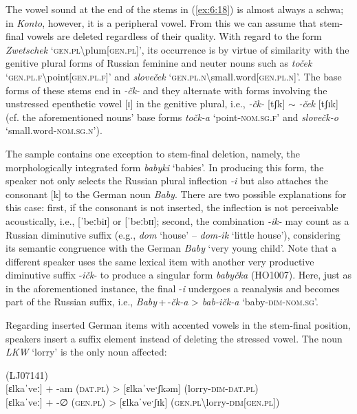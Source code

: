 \noindent The vowel sound at the end of the stems in (\ref{ex:6:18}) is almost always a schwa; in \textit{Konto}, however, it is a peripheral vowel. From this we can assume that stem-final vowels are deleted regardless of their quality. With regard to the form \textit{Zwetschek} `\textsc{gen.pl}\textbackslash{}plum[\textsc{gen.pl}]', its occurrence is by virtue of similarity with the genitive plural forms of Russian feminine and neuter nouns such as \textit{toček}  `\textsc{gen.pl.f}\textbackslash point[\textsc{gen.pl.f}]' and \textit{sloveček} `\textsc{gen.pl.n}\textbackslash small.word[\textsc{gen.pl.n}]'. The base forms of these stems end in \textit{-čk-} and they alternate with forms involving the unstressed epenthetic vowel [ɪ] in the genitive plural, i.e., \textit{-čk-} [tʃk] {$\sim$} \textit{-ček} [tʃɪk] (cf. the aforementioned nouns’ base forms \textit{točk-a} `point-\textsc{nom.sg.f}' and \textit{slovečk-o} `small.word-\textsc{nom.sg.n}'). 

The sample contains one exception to stem-final deletion, namely, the morphologically integrated form \textit{babyki} ‘babies’. In producing this form, the speaker not only selects the Russian plural inflection \textit{-i} but also attaches the consonant [k] to the German noun \textit{Baby}. There are two possible explanations for this case: first, if the consonant is not inserted, the inflection is not perceivable acoustically, i.e., [ˈbeːbiɪ] or  [ˈbeːbɪɪ]; second, the combination \textit{-ik-} may count as a Russian diminutive suffix (e.g., \textit{dom} `house' -- \textit{dom-ik} `little house'), considering its semantic congruence with  the German \textit{Baby} ‘very young child’. Note that a different speaker uses the same lexical item with another very productive diminutive suffix -\textit{ičk}- \citep[cf.][209--210]{rusgramm-tom1} to produce a singular form \textit{babyčka} (HO1007). Here, just as in the aforementioned instance, the final -\textit{i} undergoes a reanalysis and becomes part of the Russian suffix, i.e., \textit{Baby}\,+\,-\textit{čk-a} > \textit{bab-ičk-a} `baby-\textsc{dim-nom.sg}'.

Regarding inserted German items with accented vowels in the stem-final position, speakers insert a suffix element instead of deleting the stressed vowel. The noun \textit{LKW} `lorry' is the only noun affected:

\ea
\label{ex:6:19}
(LJ07141)\\
$[$ɛlkaˈveː$]$ + -am (\textsc{dat.pl}) > [ɛlkaˈveˑʃkəm] (lorry-\textsc{dim-dat.pl})\\
$[$ɛlkaˈveː$]$ + -∅{} (\textsc{gen.pl}) > [ɛlkaˈveˑʃɪk] (\textsc{gen.pl}\textbackslash lorry-\textsc{dim}$[$\textsc{gen.pl}$]$)
\z

